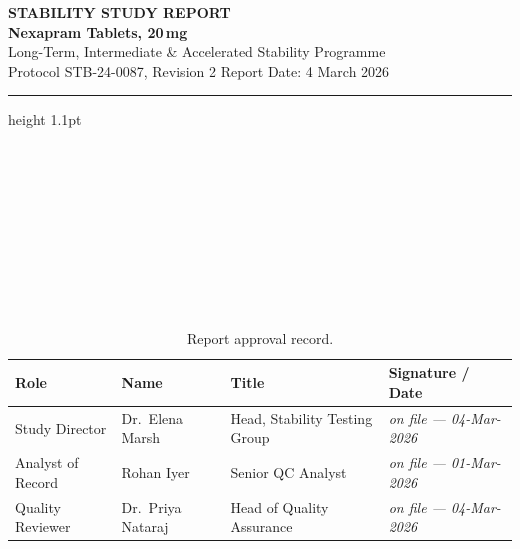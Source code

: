 \begin{center}
  {\color{ssrslate}\small\bfseries\MakeUppercase{Stability Study Report}}\\[2pt]
  {\color{ssrnavy}\Huge\bfseries Nexapram Tablets, 20\,mg}\\[4pt]
  {\color{ssrteal}\large Long-Term, Intermediate \& Accelerated Stability Programme}\\[6pt]
  {\small\color{ssrslate}Protocol STB-24-0087, Revision 2 \quad\textbar\quad Report Date: 4 March 2026}
\end{center}

\vspace{0.6em}
{\color{ssrline}\hrule height 1.1pt}
\vspace{0.8em}

\begin{minipage}[t]{0.48\textwidth}
\begin{fieldbox}
  \\
  \\
  \\
  \\
\end{fieldbox}
\end{minipage}\hfill
\begin{minipage}[t]{0.48\textwidth}
\begin{fieldbox}
  \\
  \\
  \\
  \\
\end{fieldbox}
\end{minipage}
\par
\vspace{0.6em}

\begin{table}[htbp]
\centering
\small
\begin{tabularx}{\textwidth}{@{}l X X X@{}}
\toprule
\textbf{Role} & \textbf{Name} & \textbf{Title} & \textbf{Signature / Date} \\
\midrule
Study Director & Dr.\ Elena Marsh & Head, Stability Testing Group & \textit{on file --- 04-Mar-2026} \\
Analyst of Record & Rohan Iyer & Senior QC Analyst & \textit{on file --- 01-Mar-2026} \\
Quality Reviewer & Dr.\ Priya Nataraj & Head of Quality Assurance & \textit{on file --- 04-Mar-2026} \\
\bottomrule
\end{tabularx}
\caption{Report approval record.}
\end{table}
